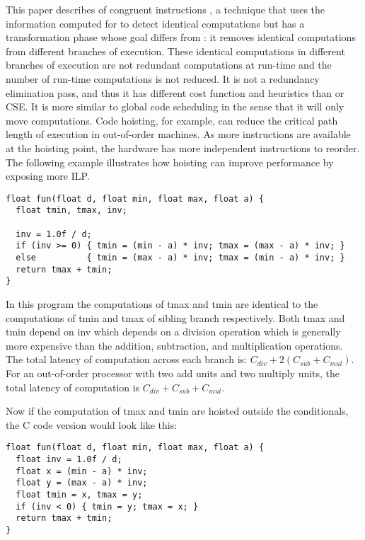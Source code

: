\documentclass[acmlarge,review,anonymous]{acmart}\settopmatter{printfolios=true}
\begin{document}
This paper describes \gcm{} of congruent instructions \cite{briggs1997}, a
technique that uses the information computed for \PRE{} to detect identical
computations but has a transformation phase whose goal differs from \PRE{}: it
removes identical computations from different branches of execution.  These
identical computations in different branches of execution are not redundant
computations at run-time and the number of run-time computations is not
reduced. It is not a redundancy elimination pass, and thus it has different cost
function and heuristics than \PRE{} or CSE. It is more similar to global code
scheduling \cite{dragonbook,click1995global} in the sense that it will only move
computations. Code hoisting, for example, can reduce the critical path length of
execution in out-of-order machines. As more instructions are available at the
hoisting point, the hardware has more independent instructions to reorder. The
following example illustrates how hoisting can improve performance by exposing
more ILP.

\begin{verbatim}
float fun(float d, float min, float max, float a) {
  float tmin, tmax, inv;

  inv = 1.0f / d;
  if (inv >= 0) { tmin = (min - a) * inv; tmax = (max - a) * inv; }
  else          { tmin = (max - a) * inv; tmax = (min - a) * inv; }
  return tmax + tmin;
}
\end{verbatim}

In this program the computations of tmax and tmin are identical to the
computations of tmin and tmax of sibling branch respectively. Both tmax and tmin
depend on inv which depends on a division operation which is generally more
expensive than the addition, subtraction, and multiplication operations. The
total latency of computation across each branch is: $C_{div} + 2(C_{sub} +
C_{mul})$.  For an out-of-order processor with two add units and two multiply
units, the total latency of computation is $C_{div} + C_{sub} + C_{mul}$.

Now if the computation of tmax and tmin are hoisted outside the
conditionals, the C code version would look like this:
\begin{verbatim}
float fun(float d, float min, float max, float a) {
  float inv = 1.0f / d;
  float x = (min - a) * inv;
  float y = (max - a) * inv;
  float tmin = x, tmax = y;
  if (inv < 0) { tmin = y; tmax = x; }
  return tmax + tmin;
}

\end{verbatim}
\end{document}
